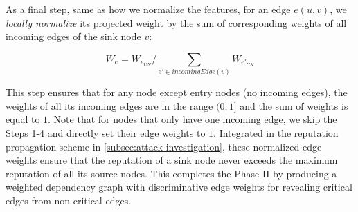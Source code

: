 As a final step, same as how we normalize the features, for an edge $e(u, v)$, we \emph{locally normalize} its projected weight by the sum of corresponding weights of all incoming edges of the sink node $v$:

\begin{equation}
    \label{eq:local-weight-normalization}
    W_e = W_{e_{UN}}/\sum_{e' \in incomingEdge(v)} W_{e'_{UN}}
\end{equation}

This step ensures that for any node except entry nodes (\ie no incoming edges), the weights of all its incoming edges are in the range $(0, 1]$ and the sum of weights is equal to $1$.
%
Note that for nodes that only have one incoming edge, we skip the Steps 1-4 and directly set their edge weights to $1$.
%
Integrated in the reputation propagation scheme in \cref{subsec:attack-investigation}, these normalized edge weights ensure that the reputation of a sink node never exceeds the maximum reputation of all its source nodes.
%
This completes the Phase II by producing a weighted dependency graph with discriminative edge weights for revealing critical edges from non-critical edges.






